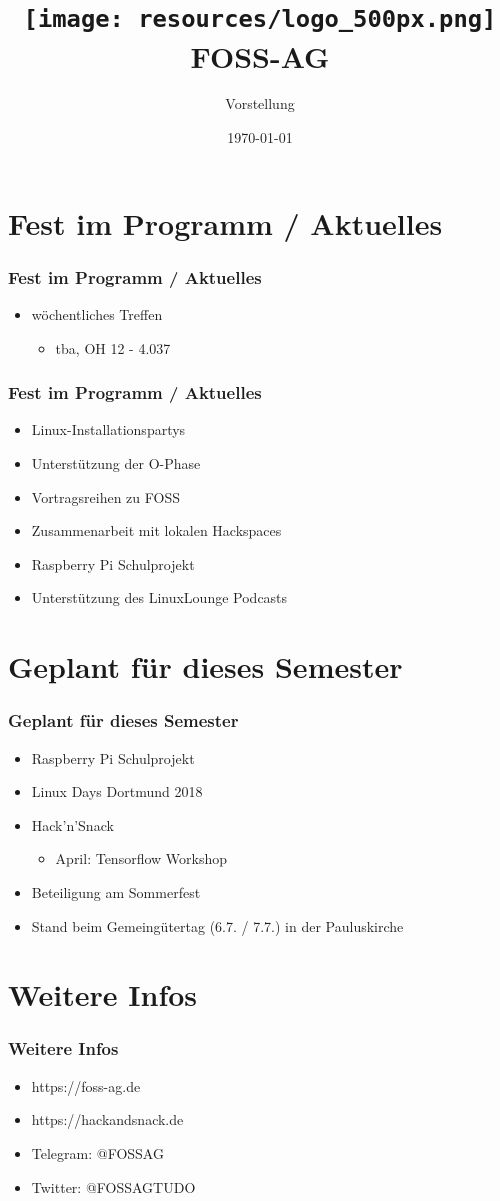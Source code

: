 \documentclass[12pt,utf8]{beamer}
\title{
	\hspace*{8cm}
	\texttt{[image: resources/logo\_500px.png]}
	\newline
	FOSS-AG
}
\subtitle{Vorstellung}
\institute[FOSS AG]{\textbf{F}ree and \textbf{O}pen \textbf{S}ource \textbf{S}oftware \textbf{AG}}
\date{\today}
\begin{document}
	\begin{frame}
		\titlepage
	\end{frame}

\section{Fest im Programm / Aktuelles}
	\begin{frame}
		\frametitle{Fest im Programm / Aktuelles}
		\begin{itemize}
			\item wöchentliches Treffen
			\begin{itemize}
				\item tba, OH 12 - 4.037
			\end{itemize}
		\end{itemize}
	\end{frame}

	\begin{frame}
		\frametitle{Fest im Programm / Aktuelles}
		\begin{itemize}
			\item Linux-Installationspartys
			\item Unterstützung der O-Phase
			\item Vortragsreihen zu FOSS
			\item Zusammenarbeit mit lokalen Hackspaces
			\item Raspberry Pi Schulprojekt
			\item Unterstützung des LinuxLounge Podcasts
		\end{itemize}
	\end{frame}

\section{Geplant für dieses Semester}
	\begin{frame}
		\frametitle{Geplant für dieses Semester}
		\begin{itemize}
			\item Raspberry Pi Schulprojekt
			\item Linux Days Dortmund 2018
			\item Hack'n'Snack
				\begin{itemize}
					\item April: Tensorflow Workshop
				\end{itemize}
			\item Beteiligung am Sommerfest
			\item Stand beim Gemeingütertag (6.7. / 7.7.) in der Pauluskirche 
		\end{itemize}
	\end{frame}

\section{Weitere Infos}
	\begin{frame}
		\frametitle{Weitere Infos}
		\begin{itemize}
			\item https://foss-ag.de
			\item https://hackandsnack.de
			\item Telegram: @FOSSAG
			\item Twitter: @FOSSAGTUDO	
		\end{itemize}
	\end{frame}
\end{document}
